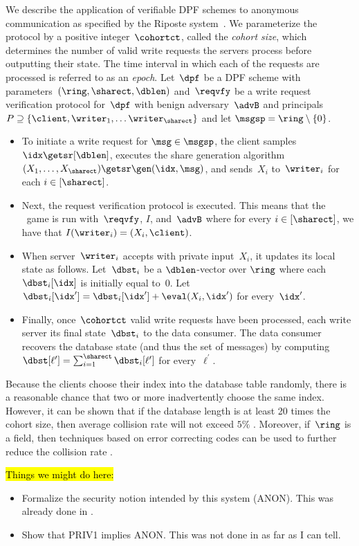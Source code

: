 %
\label{sec-anonymity}

We describe the application of verifiable DPF schemes to anonymous communication
as specified by the Riposte system~\cite{riposte}. We parameterize the protocol
by a positive integer~$\cohortct$, called the \emph{cohort size}, which
determines the number of valid write requests the servers process before
outputting their state. The time interval in which each of the requests are
processed is referred to as an \emph{epoch}. Let~$\dpf$ be a DPF scheme with
parameters~$(\ring, \sharect, \dblen)$ and~$\reqvfy$ be a write request
verification protocol for~$\dpf$ with benign adversary~$\advB$ and principals $P
\supseteq \{\client, \writer_1, \ldots \writer_{\sharect}\}$ and let $\msgsp =
\ring \setminus \{0\}$.

\begin{itemize}
  \item To initiate a write request for $\msg \in \msgsp$, the client samples
    $\idx \getsr [\dblen]$, executes the share generation algorithm $(X_1,
    \ldots, X_{\sharect}) \getsr \gen(\idx, \msg)$, and sends~$X_i$
    to~$\writer_i$ for each $i \in [\sharect]$.

  \item Next, the request verification protocol is executed. This means that the
    \protosec~game is run with~$\reqvfy$, $I$, and~$\advB$ where for every $i
    \in [\sharect]$, we have that $I(\writer_i) = (X_i, \client)$.

  \item When server~$\writer_i$ accepts with private input~$X_i$, it updates its
    local state as follows. Let~$\dbst_i$ be a $\dblen$-vector over
    $\ring$ where each $\dbst_i[\idx]$ is initially equal to~$0$. Let
    $\dbst_i[\idx^\prime] = \dbst_i[\idx^\prime] + \eval(X_i, \idx^\prime)$
    for every~$\idx^\prime$.

  \item Finally, once~$\cohortct$ valid write requests have been processed, each
    write server its final state~$\dbst_i$ to the data consumer. The data
    consumer recovers the database state (and thus the set of messages) by
    computing $\dbst[\ell^\prime] = \sum_{i=1}^{\sharect}
    \dbst_i[\ell^\prime]$ for every~$\ell^\prime$.
\end{itemize}

 Because the clients choose their index into
the database table randomly, there is a reasonable chance that two or more
inadvertently choose the same index. However, it can be shown that if the
database length is at least 20 times the cohort size, then average collision
rate will not exceed $5\%$ \cite{riposte}. Moreover, if~$\ring$ is a field, then
techniques based on error correcting codes can be used to further reduce the
collision rate \cite{riposte}.

\noindent\hl{Things we might do here:}
\begin{itemize}
  \item Formalize the security notion intended by this system (ANON). This was
    already done in \cite{riposte}.
  \item Show that PRIV1 implies ANON.  This was not done in \cite{riposte} as
    far as I can tell.
\end{itemize}
